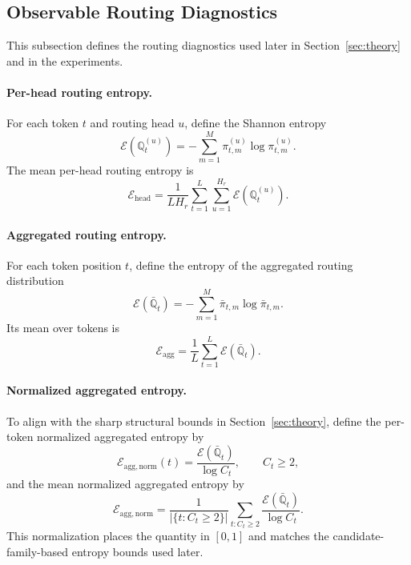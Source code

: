 \documentclass{article}
\theoremstyle{plain}
\theoremstyle{definition}
\theoremstyle{remark}
\begin{document}
\subsection{Observable Routing Diagnostics}
\label{sec:routing-diagnostics}

This subsection defines the routing diagnostics used later in Section~\ref{sec:theory} and in the experiments.

\paragraph{Per-head routing entropy.}
For each token $t$ and routing head $u$, define the Shannon entropy
\begin{equation}
\label{eq:per-head-entropy-single}
\mathcal E(\mathbb Q_t^{(u)})
=
-\sum_{m=1}^M \pi_{t,m}^{(u)}\log \pi_{t,m}^{(u)}.
\end{equation}
The mean per-head routing entropy is
\begin{equation}
\label{eq:per-head-entropy-mean}
\mathcal E_{\mathrm{head}}
=
\frac{1}{LH_r}
\sum_{t=1}^L\sum_{u=1}^{H_r}
\mathcal E(\mathbb Q_t^{(u)}).
\end{equation}

\paragraph{Aggregated routing entropy.}
For each token position $t$, define the entropy of the aggregated routing distribution
\begin{equation}
\label{eq:aggregated-entropy-single}
\mathcal E(\bar{\mathbb Q}_t)
=
-\sum_{m=1}^M \bar\pi_{t,m}\log \bar\pi_{t,m}.
\end{equation}
Its mean over tokens is
\begin{equation}
\label{eq:aggregated-entropy}
\mathcal E_{\mathrm{agg}}
=
\frac{1}{L}\sum_{t=1}^L \mathcal E(\bar{\mathbb Q}_t).
\end{equation}

\paragraph{Normalized aggregated entropy.}
To align with the sharp structural bounds in Section~\ref{sec:theory}, define the per-token normalized aggregated entropy by
\begin{equation}
\label{eq:normalized-agg-entropy-token}
\mathcal E_{\mathrm{agg,norm}}(t)
=
\frac{\mathcal E(\bar{\mathbb Q}_t)}{\log C_t},
\qquad C_t\ge 2,
\end{equation}
and the mean normalized aggregated entropy by
\begin{equation}
\label{eq:normalized-agg-entropy}
\mathcal E_{\mathrm{agg,norm}}
=
\frac{1}{|\{t:C_t\ge 2\}|}
\sum_{t:C_t\ge 2}
\frac{\mathcal E(\bar{\mathbb Q}_t)}{\log C_t}.
\end{equation}
This normalization places the quantity in $[0,1]$ and matches the candidate-family-based entropy bounds used later.
\end{document}
